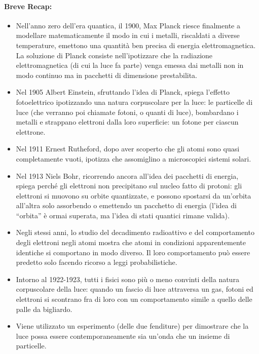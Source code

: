 
\paragraph{Breve Recap:}

\begin{itemize}
  \item Nell’anno zero dell’era quantica, il 1900, Max Planck riesce
finalmente a modellare matematicamente il modo in cui i metalli,
riscaldati a diverse temperature, emettono una quantità ben precisa
di energia elettromagnetica. La soluzione di Planck
consiste nell’ipotizzare che
la radiazione elettromagnetica
(di cui la luce fa parte) venga
emessa dai metalli non in
modo continuo ma in
pacchetti di dimensione
prestabilita.
\item Nel 1905 Albert Einstein, sfruttando l’idea di Planck, spiega l’effetto
fotoelettrico ipotizzando una natura corpuscolare per la luce: le
particelle di luce (che verranno poi chiamate fotoni, o quanti di
luce), bombardano i metalli e strappano elettroni dalla loro superficie:
un fotone per ciascun elettrone.
\item Nel 1911 Ernest Rutheford, dopo aver scoperto che gli atomi sono
quasi completamente vuoti, ipotizza che assomiglino a microscopici
sistemi solari. 
\item Nel 1913 Niels Bohr, ricorrendo ancora all’idea dei pacchetti di
energia, spiega perché gli elettroni non precipitano sul nucleo fatto di
protoni: gli elettroni si muovono su orbite quantizzate, e possono spostarsi da
un’orbita all’altra solo assorbendo o emettendo un pacchetto di
energia (l’idea di “orbita” è ormai
superata, ma l’idea di stati quantici
rimane valida).
\item Negli stessi anni, lo studio del decadimento radioattivo e del
comportamento degli elettroni negli atomi mostra che atomi in
condizioni apparentemente identiche si comportano in modo diverso. Il loro comportamento può essere predetto solo facendo ricorso a
leggi probabilistiche. 
\item Intorno al 1922-1923, tutti i fisici sono più o meno convinti della
natura corpuscolare della luce: quando un fascio di luce attraversa un
gas, fotoni ed elettroni si scontrano fra di loro con un comportamento
simile a quello delle palle da bigliardo. 
\item Viene utilizzato un esperimento (delle due fenditure) per dimostrare che la luce possa essere contemporaneamente sia un'onda che un insieme di particelle.

\end{itemize}
